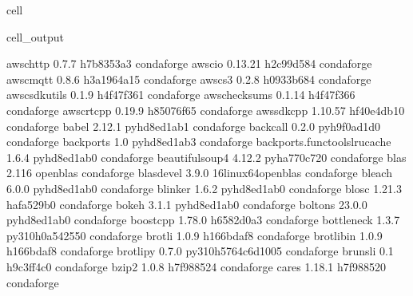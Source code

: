 \documentclass[letterpaper,table,10pt,english]{jupyterBook}
\begin{document}
\begin{sphinxuseclass}{cell}
\begin{sphinxVerbatimOutput}
\begin{sphinxuseclass}{cell_output}
\begin{sphinxVerbatim}[commandchars=\\\{\}]
aws\PYGZhy{}c\PYGZhy{}http                0.7.7                h7b8353a\PYGZus{}3    conda\PYGZhy{}forge
aws\PYGZhy{}c\PYGZhy{}io                  0.13.21              h2c99d58\PYGZus{}4    conda\PYGZhy{}forge
aws\PYGZhy{}c\PYGZhy{}mqtt                0.8.6               h3a1964a\PYGZus{}15    conda\PYGZhy{}forge
aws\PYGZhy{}c\PYGZhy{}s3                  0.2.8                h0933b68\PYGZus{}4    conda\PYGZhy{}forge
aws\PYGZhy{}c\PYGZhy{}sdkutils            0.1.9                h4f47f36\PYGZus{}1    conda\PYGZhy{}forge
aws\PYGZhy{}checksums             0.1.14               h4f47f36\PYGZus{}6    conda\PYGZhy{}forge
aws\PYGZhy{}crt\PYGZhy{}cpp               0.19.9               h85076f6\PYGZus{}5    conda\PYGZhy{}forge
aws\PYGZhy{}sdk\PYGZhy{}cpp               1.10.57             hf40e4db\PYGZus{}10    conda\PYGZhy{}forge
babel                     2.12.1             pyhd8ed1ab\PYGZus{}1    conda\PYGZhy{}forge
backcall                  0.2.0              pyh9f0ad1d\PYGZus{}0    conda\PYGZhy{}forge
backports                 1.0                pyhd8ed1ab\PYGZus{}3    conda\PYGZhy{}forge
backports.functools\PYGZus{}lru\PYGZus{}cache 1.6.4              pyhd8ed1ab\PYGZus{}0    conda\PYGZhy{}forge
beautifulsoup4            4.12.2             pyha770c72\PYGZus{}0    conda\PYGZhy{}forge
blas                      2.116                  openblas    conda\PYGZhy{}forge
blas\PYGZhy{}devel                3.9.0           16\PYGZus{}linux64\PYGZus{}openblas    conda\PYGZhy{}forge
bleach                    6.0.0              pyhd8ed1ab\PYGZus{}0    conda\PYGZhy{}forge
blinker                   1.6.2              pyhd8ed1ab\PYGZus{}0    conda\PYGZhy{}forge
blosc                     1.21.3               hafa529b\PYGZus{}0    conda\PYGZhy{}forge
bokeh                     3.1.1              pyhd8ed1ab\PYGZus{}0    conda\PYGZhy{}forge
boltons                   23.0.0             pyhd8ed1ab\PYGZus{}0    conda\PYGZhy{}forge
boost\PYGZhy{}cpp                 1.78.0               h6582d0a\PYGZus{}3    conda\PYGZhy{}forge
bottleneck                1.3.7           py310h0a54255\PYGZus{}0    conda\PYGZhy{}forge
brotli                    1.0.9                h166bdaf\PYGZus{}8    conda\PYGZhy{}forge
brotli\PYGZhy{}bin                1.0.9                h166bdaf\PYGZus{}8    conda\PYGZhy{}forge
brotlipy                  0.7.0           py310h5764c6d\PYGZus{}1005    conda\PYGZhy{}forge
brunsli                   0.1                  h9c3ff4c\PYGZus{}0    conda\PYGZhy{}forge
bzip2                     1.0.8                h7f98852\PYGZus{}4    conda\PYGZhy{}forge
c\PYGZhy{}ares                    1.18.1               h7f98852\PYGZus{}0    conda\PYGZhy{}forge

\end{sphinxVerbatim}
\end{sphinxuseclass}
\end{sphinxVerbatimOutput}
\end{sphinxuseclass}
\end{document}
